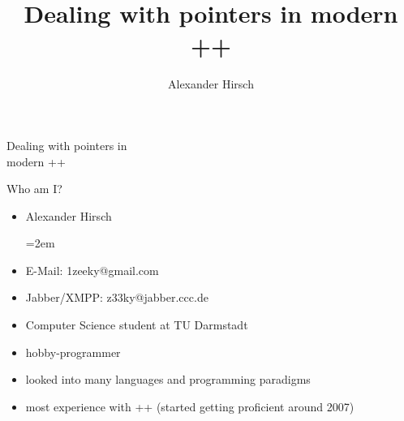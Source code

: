 


\author{Alexander Hirsch}

	\title{Dealing with pointers in modern \C++}
	\subtitle{\insertauthor}
	
	\begin{frame}
		\begin{center}
			{\Huge Dealing with pointers in \\ modern \C++}
		\end{center}
		
	\end{frame}
	
	\begin{frame}{Who am I?}
		\begin{itemize}
			\item Alexander Hirsch
				
			\leftskip=2em
				\item E-Mail: 1zeeky@gmail.com
				\item Jabber/XMPP: z33ky@jabber.ccc.de
				
			\leftskip=0pt
			
			\emptyline
			\item Computer Science student at TU Darmstadt
			\item hobby-programmer
			\emptyline
			\item looked into many languages and programming paradigms
			\item most experience with \C++ (started getting proficient around 2007)
		\end{itemize}
	\end{frame}
		
